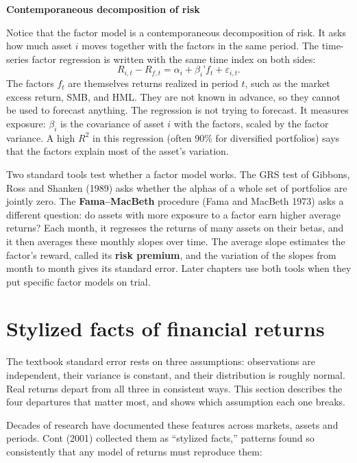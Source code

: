 \begin{callout}
\noindent \textbf{Contemporaneous decomposition of risk}

Notice that the factor model is a contemporaneous decomposition of risk. It asks how much asset $i$ moves together with the factors in the same period. 
The time-series factor regression is written with the same time index on both sides:
\begin{equation}
R_{i,t} - R_{f,t} = \alpha_i + \beta_i’ f_t + \varepsilon_{i,t}.
\end{equation}
The factors $f_t$ are themselves returns realized in period $t$, such as the market excess return, SMB, and HML. They are not known in advance, so they cannot be used to forecast anything. The regression is not trying to forecast. It measures exposure: $\beta_i$ is the covariance of asset $i$ with the factors, scaled by the factor variance. A high $R^2$ in this regression (often 90\% 
for diversified portfolios) says that the factors explain most of the asset’s variation.
\end{callout}

Two standard tools test whether a factor model works. The GRS test of Gibbons, Ross and Shanken (1989) asks whether the alphas of a whole set of portfolios are jointly zero. The \textbf{Fama--MacBeth} procedure (Fama and MacBeth 1973) asks a different question: do assets with more exposure to a factor earn higher average returns? Each month, it regresses the returns of many assets on their betas, and it then averages these monthly slopes over time. The average slope estimates the factor's reward, called its \textbf{risk premium}, and the variation of the slopes from month to month gives its standard error. Later chapters use both tools when they put specific factor models on trial.


\section{Stylized facts of financial returns}
\label{sec:03-facts}

The textbook standard error rests on three assumptions: observations are
independent, their variance is constant, and their distribution is roughly
normal. Real returns depart from all three in consistent ways. This section
describes the four departures that matter most, and shows which assumption each
one breaks.

Decades of research have documented these features across markets, assets and
periods. Cont (2001) collected them as ``stylized facts,'' patterns found so
consistently that any model of returns must reproduce them:

